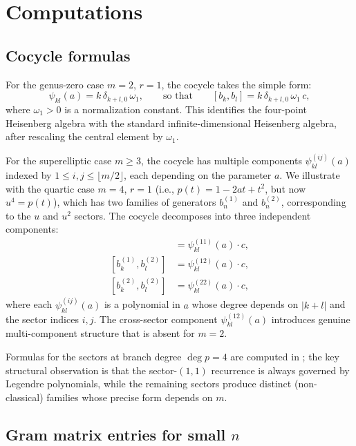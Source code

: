 \documentclass[12pt]{amsart}
\theoremstyle{plain}
\theoremstyle{definition}
\begin{document}
\appendix
\section{Computations}
\label{sec:computations}

\subsection{Cocycle formulas}
\label{app:cocycle}

For the genus-zero case $m = 2$, $r = 1$, the cocycle takes the simple form:
\[
  \psi_{kl}(a) = k\,\delta_{k+l,0}\, \omega_1,
  \qquad\text{so that}\qquad
  [b_k, b_l] = k\,\delta_{k+l,0}\,\omega_1\,c,
\]
where $\omega_1 > 0$ is a normalization constant. This identifies the four-point
Heisenberg algebra with the standard infinite-dimensional Heisenberg algebra,
after rescaling the central element by $\omega_1$.

For the superelliptic case $m \geq 3$, the cocycle has multiple components
$\psi_{kl}^{(ij)}(a)$ indexed by $1 \leq i, j \leq \lfloor m/2 \rfloor$, each depending
on the parameter $a$. We illustrate with the quartic case $m = 4$, $r = 1$
(i.e., $p(t) = 1 - 2at + t^2$, but now $u^4 = p(t)$), which has two families
of generators $b_n^{(1)}$ and $b_n^{(2)}$, corresponding to the $u$ and $u^2$ sectors.
The cocycle decomposes into three independent components:
\begin{align*}
  [b_k^{(1)}, b_l^{(1)}] &= \psi_{kl}^{(11)}(a) \cdot c, \\
  [b_k^{(1)}, b_l^{(2)}] &= \psi_{kl}^{(12)}(a) \cdot c, \\
  [b_k^{(2)}, b_l^{(2)}] &= \psi_{kl}^{(22)}(a) \cdot c,
\end{align*}
where each $\psi^{(ij)}_{kl}(a)$ is a polynomial in $a$ whose degree
depends on $|k+l|$ and the sector indices $i,j$. The cross-sector component
$\psi_{kl}^{(12)}(a)$ introduces genuine multi-component structure that
is absent for $m=2$.

Formulas for the sectors at branch degree $\deg p = 4$ are computed in
\cite{SantosNeklyudovFutorny2025};
the key structural observation is that the sector-$(1,1)$ recurrence is always governed by
Legendre polynomials, while the remaining sectors produce distinct (non-classical) families
whose precise form depends on $m$.

\subsection{Gram matrix entries for small $n$}
\label{app:gram}
\end{document}
